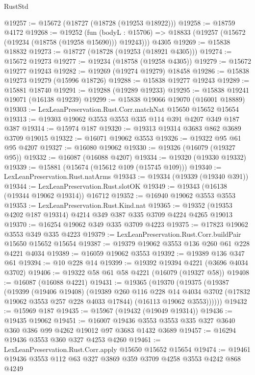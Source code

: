 \begin{lexlean}{RustStd}
\begin{coremodule}
@19257 := @15672 (@18727 (@18728 (@19253 @18922)))
@19258 := @18759 @4172
@19268 := @19252
    (fun (bodyL : @15706) => @18833 (@19257 (@15672 (@19234 (@18758 (@19258 @15690))) @19243)))
    @4305
@19269 := @15838 @18832
@19273 := @18727 (@18728 (@19253 (@18921 @4305)))
@19274 := @15672 @19273
@19277 := @19234 (@18758 (@19258 @4305))
@19279 := @15672 @19277 @19243
@19282 := @19269 (@19274 @19279) @18458
@19286 := @15838 @19273 @19279 (@15996 @18726)
@19288 := @15838 @19277 @19243
@19289 := @15881 @18740
@19291 := @19288 (@19289 @19233)
@19295 := @15838 @19241 @19071 (@16138 @19239)
@19299 := @15838 @19066 @19070 (@16001 @18889)
@19303 := LexLeanPreservation.Rust.Corr.matchNat @15650 @15652 @15654
@19313 := @19303 @19062 @3553 @3553 @335 @114 @391 @4207 @349 @187 @387
@19314 := @15974 @187
@19320 := @19313 @19314 @3683 @862 @3689 @3709 @19015
@19322 := @16071 @19062 @3553
@19326 := @19322 @95 @61 @95 @4207
@19327 := @16080 @19062
@19330 := @19326 (@16079 (@19327 @95))
@19332 := @16087 (@16088 @4207)
@19334 := @19320 (@19330 @19332)
@19339 := @15881 (@15674 (@15612 @109 (@15745 @109)))
@19340 := LexLeanPreservation.Rust.natArms
@19343 := @19334 (@19339 (@19340 @391))
@19344 := LexLeanPreservation.Rust.slotOK
@19349 := @19343 (@16138 (@19344 @19062 @19314)) @16712
@19352 := @16940 @19062 @3553 @3553
@19353 := LexLeanPreservation.Rust.Kind.nat
@19365 := @19352 (@19353 @4202 @187 @19314) @4214 @349 @387 @335 @3709 @4224 @4265 @19013
@19370 := @16254 @19062 @349 @335 @3709 @4223
@19375 := @17823 @19062 @3553 @349 @335 @4223
@19379 := LexLeanPreservation.Rust.Corr.buildPair @15650 @15652 @15654
@19387 := @19379 @19062 @3553 @136 @260 @61 @228 @4221 @4034
@19389 := @16059 @19062 @3553
@19392 := @19389 @136 @347 @61
@19394 := @10 @228 @14
@19399 := @19392 @19394 @4221 (@3696 @4034 @3702)
@19406 := @19322 @58 @61 @58 @4221 (@16079 (@19327 @58))
@19408 := @16087 (@16088 @4221)
@19431 := @19365
    (@19370
      (@19375
        (@19387
          (@19399
            (@19406 @19408)
            (@19389
              @260
              @116
              @228
              @14
              @4034
              @3702
              (@17832 @19062 @3553 @257 @228 @4033 @17844)
              (@16113 @19062 @3553))))))
@19432 := @15969 @187
@19435 := @15967 (@19432 (@19049 @19314))
@19436 := @19435 @19062
@19451 := @16007 @19436 @3553 @3553 @335 @327 @3640 @360 @386 @99 @4262 @19012 @97 @3683 @1432 @3689
@19457 := @16294 @19436 @3553 @360 @327 @4253 @4260
@19461 := LexLeanPreservation.Rust.Corr.apply @15650 @15652 @15654
@19474 := @19461 @19436 @3553 @112 @63 @327 @3869 @359 @3709 @4258 @3553 @4242 @868 @4249

\end{coremodule}
\end{lexlean}
